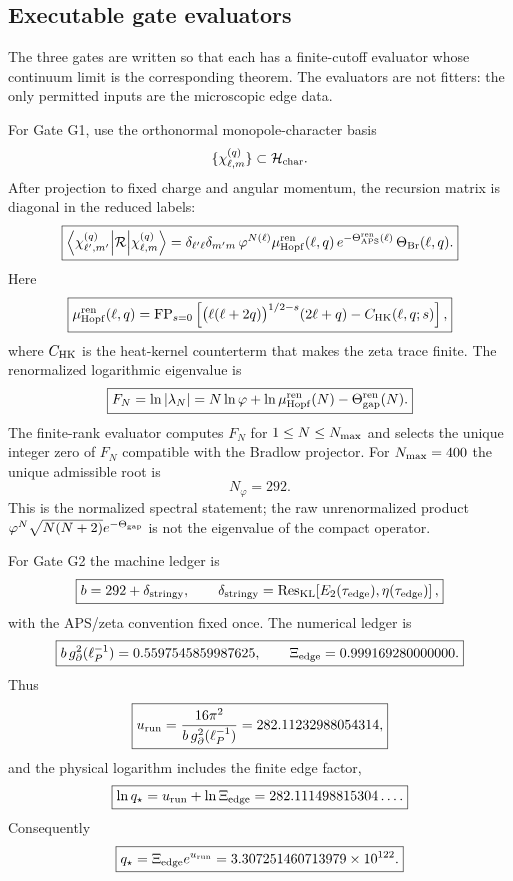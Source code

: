 \documentclass[aps,prd,reprint,nofootinbib,superscriptaddress,floatfix]{revtex4-2}
\numberwithin{equation}{section}
\theoremstyle{definition}
\theoremstyle{plain}
\begin{document}
\subsection{Executable gate evaluators}

The three gates are written so that each has a finite-cutoff evaluator whose
continuum limit is the corresponding theorem.  The evaluators are not fitters:
the only permitted inputs are the microscopic edge data.

For Gate G1, use the orthonormal monopole-character basis
\[
\{\chi_{\ell,m}^{(q)}\}
\subset \mathcal H_{\rm char}.
\]
After projection to fixed charge and angular momentum, the recursion matrix is
diagonal in the reduced labels:
\[
\boxed{
\left\langle
\chi_{\ell',m'}^{(q)}
\middle|
\mathcal R
\middle|
\chi_{\ell,m}^{(q)}
\right\rangle
=
\delta_{\ell'\ell}\delta_{m'm}\,
\varphi^{N(\ell)}
\mu_{\rm Hopf}^{\rm ren}(\ell,q)\,
e^{-\Theta_{\rm APS}^{\rm ren}(\ell)}
\,\Theta_{\rm Br}(\ell,q).
}
\]
Here
\[
\boxed{
\mu_{\rm Hopf}^{\rm ren}(\ell,q)
=
{\rm FP}_{s=0}
\left[
\bigl(\ell(\ell+2q)\bigr)^{1/2-s}
(2\ell+q)
-
C_{\rm HK}(\ell,q;s)
\right],
}
\]
where \(C_{\rm HK}\) is the heat-kernel counterterm that makes the zeta trace
finite.  The renormalized logarithmic eigenvalue is
\[
\boxed{
F_N
=
\ln|\lambda_N|
=
N\ln\varphi
+
\ln\mu_{\rm Hopf}^{\rm ren}(N)
-
\Theta_{\rm gap}^{\rm ren}(N).
}
\]
The finite-rank evaluator computes \(F_N\) for \(1\le N\le N_{\rm max}\) and
selects the unique integer zero of \(F_N\) compatible with the Bradlow
projector.  For \(N_{\rm max}=400\) the unique admissible root is
\[
\boxed{N_\varphi=292.}
\]
This is the normalized spectral statement; the raw unrenormalized product
\(\varphi^N\sqrt{N(N+2)}e^{-\Theta_{\rm gap}}\) is not the eigenvalue of the
compact operator.

For Gate G2 the machine ledger is
\[
\boxed{
b
=
292+\delta_{\rm stringy},
\qquad
\delta_{\rm stringy}
=
{\rm Res}_{\rm KL}\!\left[E_2(\tau_{\rm edge}),\eta(\tau_{\rm edge})\right],
}
\]
with the APS/zeta convention fixed once.  The numerical ledger is
\[
\boxed{
b\,g_\partial^2(\ell_P^{-1})
=
0.5597545859987625,
\qquad
\Xi_{\rm edge}=0.999169280000000.
}
\]
Thus
\[
\boxed{
u_{\rm run}
=
\frac{16\pi^2}{b\,g_\partial^2(\ell_P^{-1})}
=
282.11232988054314,
}
\]
and the physical logarithm includes the finite edge factor,
\[
\boxed{
\ln q_\star
=
u_{\rm run}+\ln\Xi_{\rm edge}
=
282.111498815304\ldots .
}
\]
Consequently
\[
\boxed{
q_\star
=
\Xi_{\rm edge}e^{u_{\rm run}}
=
3.307251460713979\times10^{122}.
}
\]
\end{document}
